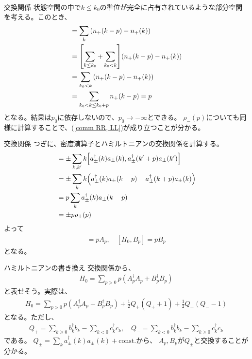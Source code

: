 \documentclass[\main/TL_liquid.tex]{subfiles}
\begin{document}
\begin{frame}{交換関係}
    状態空間の中で$k \le k_0$の準位が完全に占有されているような部分空間を考える。このとき、
    \begin{align}
        [\rho_+(-p),\rho_+(p)]
        &=
        \sum_k \qty(n_+(k-p) - n_+(k))
        \\ & \nonumber
        = \qty[\sum_{k \le k_0} + \sum_{k _0 < k}] \qty(n_+(k-p)-n_+(k))
        \\ & \nonumber
        = \sum_{k_0 < k} \qty(n_+(k-p) - n_+(k))
        \\ &
        = \sum_{k_0 < k \le k_0+p} n_+(k-p)
        = p
    \end{align}
    となる。結果は$p_0$に依存しないので、$p_0 \to -\infty$とできる。
    $\rho_-(p)$についても同様に計算することで、(\ref{comm RR, LL})が成り立つことが分かる。
\end{frame}

\begin{frame}{交換関係}
    つぎに、密度演算子とハミルトニアンの交換関係を計算する。
    \begin{align}
        [H_0, \rho_{\pm}(p)] &
        = \nonumber
        \pm \sum_{k,k'} k\qty[a_{\pm}^\dagger(k)a_{\pm}(k),a_{\pm}^\dagger(k'+p)a_{\pm}(k')]
        \\ &\nonumber
        = \pm \sum_k k \qty(a_{\pm}^\dagger(k) a_{\pm}(k-p)-a_{\pm}^\dagger(k+p)a_{\pm}(k))
        \\ &\nonumber
        = p\sum_k a_{\pm}^\dagger(k) a_{\pm}(k-p)
        \\ &
        = \pm p \rho_{\pm}(p)
    \end{align}
    よって
    \begin{align}
        [H_0, A_p] = p A_p,
        \quad
        [H_0, B_p] = p B_p
    \end{align}
    となる。
\end{frame}

\begin{frame}{ハミルトニアンの書き換え}
    交換関係から、
    \begin{align}
        H_0 = \sum_{p>0} p(A_p^\dagger A_p + B_p^\dagger B_p)
    \end{align}
    と表せそう。実際は、
    \begin{align}
        H_0 = \sum_{p>0} p(A_p^\dagger A_p + B_p^\dagger B_p) + \frac{1}{2}Q_+(Q_++1) + \frac{1}{2}Q_-(Q_--1)
        \label{Bosoinzation Hamiltoninan}
    \end{align}
    となる。ただし、
    \begin{align}
        Q_+ = \sum_{k \ge 0} b_k^\dagger b_k - \sum_{k<0} c_k^\dagger c_k,
        \quad
        Q_- = \sum_{k < 0} b_k^\dagger b_k - \sum_{k \ge 0} c_k^\dagger c_k
    \end{align}
    である。
    $Q_{\pm} = \sum_k a_{\pm}^\dagger(k)a_{\pm}(k) + \mathrm{const.}$から、
    $A_p, B_p$が$Q_{\pm}$と交換することが分かる。
\end{frame}
\end{document}
